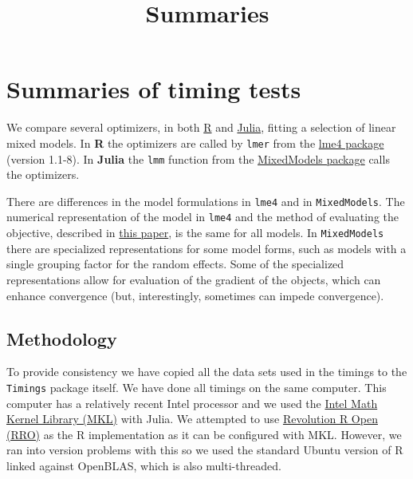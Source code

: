 \documentclass{article}
\title{Summaries}
\begin{document}

    
    
    \maketitle
    
    

    
    \section{Summaries of timing tests}\label{summaries-of-timing-tests}

We compare several optimizers, in both
\href{http://www.R-project.org}{R} and
\href{http://julialang.org}{Julia}, fitting a selection of linear mixed
models. In \textbf{R} the optimizers are called by \texttt{lmer} from
the \href{https://github.com/lme4/lme4}{lme4 package} (version 1.1-8).
In \textbf{Julia} the \texttt{lmm} function from the
\href{https://github.com/dmbates/MixedModels.jl}{MixedModels package}
calls the optimizers.

There are differences in the model formulations in \texttt{lme4} and in
\texttt{MixedModels}. The numerical representation of the model in
\texttt{lme4} and the method of evaluating the objective, described in
\href{http://arxiv.org/abs/1406.5823}{this paper}, is the same for all
models. In \texttt{MixedModels} there are specialized representations
for some model forms, such as models with a single grouping factor for
the random effects. Some of the specialized representations allow for
evaluation of the gradient of the objects, which can enhance convergence
(but, interestingly, sometimes can impede convergence).

\subsection{Methodology}\label{methodology}

To provide consistency we have copied all the data sets used in the
timings to the \texttt{Timings} package itself. We have done all timings
on the same computer. This computer has a relatively recent Intel
processor and we used the
\href{https://software.intel.com/en-us/intel-mkl}{Intel Math Kernel
Library (MKL)} with Julia. We attempted to use
\href{www.revolutionanalytics.com/revolution-r-open}{Revolution R Open
(RRO)} as the R implementation as it can be configured with MKL.
However, we ran into version problems with this so we used the standard
Ubuntu version of R linked against OpenBLAS, which is also
multi-threaded.
\end{document}
